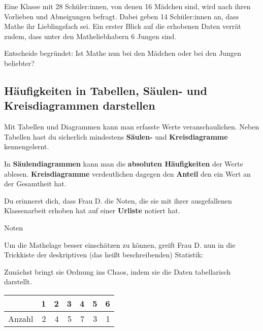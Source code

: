 \documentclass[
  ngerman,
]{book}
\begin{document}
Eine Klasse mit 28 Schüler:innen, von denen 16 Mädchen sind, wird nach ihren Vorlieben und Abneigungen befragt. Dabei geben 14 Schüler:innen an, dass Mathe ihr Lieblingsfach sei. Ein erster Blick auf die erhobenen Daten verrät zudem, dass unter den Matheliebhabern 6 Jungen sind.

Entscheide begründet: Ist Mathe nun bei den Mädchen oder bei den Jungen beliebter?

\hypertarget{section-10}{%
\subsubsection*{}\label{section-10}}

\hypertarget{section-11}{%
\subsubsection*{}\label{section-11}}

\hypertarget{huxe4ufigkeiten-in-tabellen-suxe4ulen--und-kreisdiagrammen-darstellen}{%
\subsection*{Häufigkeiten in Tabellen, Säulen- und Kreisdiagrammen darstellen}\label{huxe4ufigkeiten-in-tabellen-suxe4ulen--und-kreisdiagrammen-darstellen}}

Mit Tabellen und Diagrammen kann man erfasste Werte veranschaulichen. Neben Tabellen hast du sicherlich mindestens \textbf{Säulen-} und \textbf{Kreisdiagramme} kennengelernt.

In \textbf{Säulendiagrammen} kann man die \textbf{absoluten Häufigkeiten} der Werte ablesen. \textbf{Kreisdiagramme} verdeutlichen dagegen den \textbf{Anteil} den ein Wert an der Gesamtheit hat.

Du erinnerst dich, dass Frau D. die Noten, die sie mit ihrer ausgefallenen Klassenarbeit erhoben hat auf einer \textbf{Urliste} notiert hat.

Noten

Um die Mathelage besser einschätzen zu können, greift Frau D. nun in die Trickkiste der deskriptiven (das heißt beschreibenden) Statistik:

Zunächst bringt sie Ordnung ins Chaos, indem sie die Daten tabellarisch darstellt.

\begin{tabular}[t]{l|r|r|r|r|r|r}
\hline
  & 1 & 2 & 3 & 4 & 5 & 6\\
\hline
Anzahl & 2 & 4 & 5 & 7 & 3 & 1\\
\hline
\end{tabular}
\end{document}
